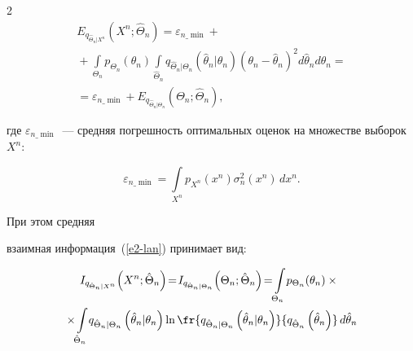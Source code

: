 \begin{multicols}{2}
\begin{multline}


E_{q_{\hat{\Theta}_n\vert X^n}}\left(X^n;\hat{\Theta}_n\right) = \varepsilon_{n\_\min} +{}\\


{}+\int\limits_{\Theta_n}  p_{\Theta_n} (\theta_n) \!


\int\limits_{\hat{\Theta}_n}  q_{\hat{\Theta}_n\vert \Theta_n}


\left(\hat{\theta}_n\vert \theta_n\right) \left(\theta_n-\hat{\theta}_n\right)^2 d\hat{\theta}_nd\theta_n = {}\\


{}=


\varepsilon_{n\_\min} +E_{q_{\hat{\Theta}_n\vert\Theta_n}}(\Theta_n; \hat{\Theta}_n),


\label{e6-lan}


\end{multline}


где $\varepsilon_{n\_\min}$~--- средняя по\-греш\-ность оптимальных оценок на множестве выборок~$X^n$:


$$


\varepsilon_{n\_\min}=\int\limits_{X^n} p_{X^n} (x^n) \sigma_n^2 (x^n)\,dx^n.


$$  


 При этом сред\-няя 


взаимная информация~(\ref{e2-lan}) принимает вид: 





\vspace*{-3pt}





\noindent


\begin{multline}


\! \! I_{q_{\hat{\Theta}_n\vert X^n}} \!\left(X^n; \hat{\Theta}_n\right) \!=\!I_{q_{\hat{\Theta}_n\vert\Theta_n}} 


\!\left(\Theta_n;\hat{\Theta}_n\right) \!=\! \int\limits_{\Theta_n} \!p_{\Theta_n}(\theta_n)\times{}\\


\!{}\times\!


 \int\limits_{\hat{\Theta}_n} \!


q_{\hat{\Theta}_n\vert \Theta_n} \left(\hat{\theta}_n\vert \theta_n\right) \ln \fr{q_{\hat{\Theta}_n\vert 


\Theta_n} \left(\hat{\theta}_n\vert \theta_n\right)}{q_{\hat{\Theta}_n}\left(\hat{\theta}_n\right)}\,d\hat{\theta}_n 



\end{multline}
\end{multicols}
